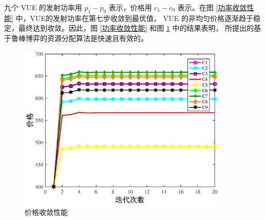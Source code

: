 九个 VUE 的发射功率用 $p_{1}-p_{9}$ 表示，价格用 $c_{1}-c_{9}$ 表示。在图 \ref{功率收敛性能} 中，VUE的发射功率在第七步收敛到最优值，
VUE 的非均匀价格逐渐趋于稳定，最终达到收敛。因此，图 \ref{功率收敛性能} 和图 \ref{价格收敛性能} 中的结果表明，
所提出的基于鲁棒博弈的资源分配算法是快速且有效的。
\begin{figure}[H]
\centering
\includegraphics[width=10cm]{figures//chap2//价格.eps}
\caption{价格收敛性能}
\label{价格收敛性能}
\end{figure}

